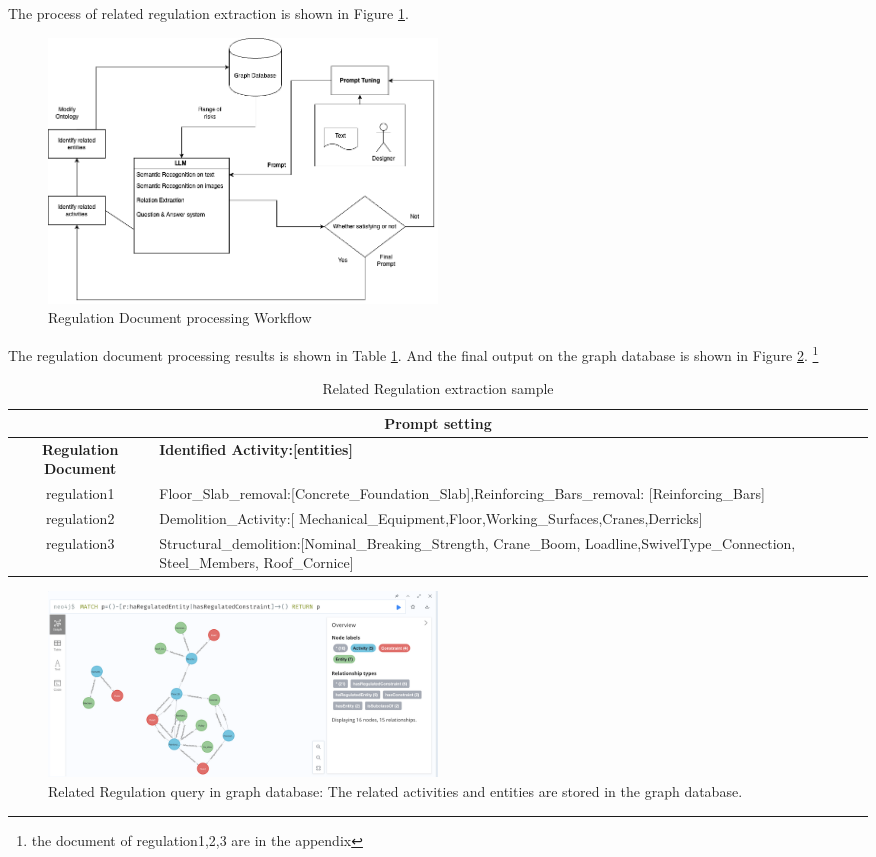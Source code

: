 The process of related regulation extraction is shown in Figure \ref{fig:related_regulation_workflow}.
\begin{figure}
    \label{fig:related_regulation_workflow}
    \centering
    \includegraphics[width=0.5\textwidth]{figures/text_extraction.png}
    \caption{Regulation Document processing Workflow}
\end{figure}

The regulation document processing results is shown in Table \ref{tab:related_regulation_sample}. %
And the final output on the graph database is shown in Figure \ref{fig:related_regulation_query}.
\footnote{the document of regulation1,2,3 are in the appendix}

\begin{table}
    \centering
    \label{tab:related_regulation_sample}
    \begin{tabularx}{\textwidth}{cX}
        \hline 
        \multicolumn{2}{c}{Prompt setting} \\
        \hline
        \textbf{Regulation Document} & \textbf{Identified Activity:[entities]}  \\
        \hline
        regulation1 & Floor\_Slab\_removal:[Concrete\_Foundation\_Slab],Reinforcing\_Bars\_removal: [Reinforcing\_Bars]  \\
        \hline
        regulation2 & Demolition\_Activity:[ Mechanical\_Equipment,Floor,Working\_Surfaces,Cranes,Derricks]  \\
        \hline
        regulation3 &  Structural\_demolition:[Nominal\_Breaking\_Strength, Crane\_Boom, Loadline,SwivelType\_Connection, Steel\_Members, Roof\_Cornice] \\
    \end{tabularx}
    \caption{Related Regulation extraction sample}
\end{table}

\begin{figure}
    \label{fig:related_regulation_query}
    \centering
    \includegraphics[width=0.5\textwidth]{figures/regulation relation.png}
    \caption{Related Regulation query in graph database: The related activities and entities are stored in the graph database.}
\end{figure}

